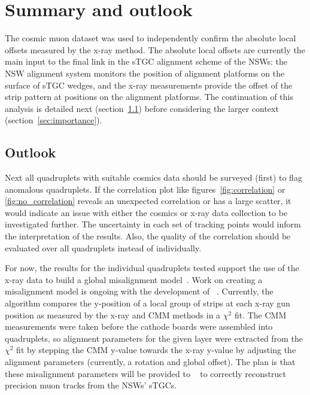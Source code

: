 
\chapter{Summary and outlook}
\label{chap:summary}

The cosmic muon dataset was used to independently confirm the absolute local offsets measured by the x-ray method. The absolute local offsets are currently the main input to the final link in the sTGC alignment scheme of the NSWs: the NSW alignment system monitors the position of alignment platforms on the surface of sTGC wedges, and the x-ray measurements provide the offset of the strip pattern at positions on the alignment platforms. The continuation of this analysis is detailed next (section~\ref{sec:outlook}) before considering the larger context (section~\ref{sec:importance}). 

\section{Outlook}
\label{sec:outlook}

Next all quadruplets with suitable cosmics data should be surveyed (first) to flag anomalous quadruplets. If the correlation plot like figures~\ref{fig:correlation} or \ref{fig:no_correlation} reveals an unexpected correlation or has a large scatter, it would indicate an issue with either the cosmics or x-ray data collection to be investigated further. The uncertainty in each set of tracking points would inform the interpretation of the results. Also, the quality of the correlation should be evaluated over all quadruplets instead of individually. 
 
For now, the results for the individual quadruplets tested support the use of the x-ray data to build a global misalignment model~\cite{lefebvre_precision_2020}. Work on creating a misalignment model is ongoing with the development of ~\cite{lefebvre_stgc_as_built_fit}. Currently, the algorithm compares the y-position of a local group of strips at each x-ray gun position as measured by the x-ray and CMM methods in a $\chi^2$ fit. The CMM measurements were taken before the cathode boards were assembled into quadruplets, so alignment parameters for the given layer were extracted from the $\chi^2$ fit by stepping the CMM y-value towards the x-ray y-value by adjusting the alignment parameters (currently, a rotation and global offset). The plan is that these misalignment parameters will be provided to ~\cite{the_atlas_collaboration_athena} to correctly reconstruct precision muon tracks from the NSWs' sTGCs.

